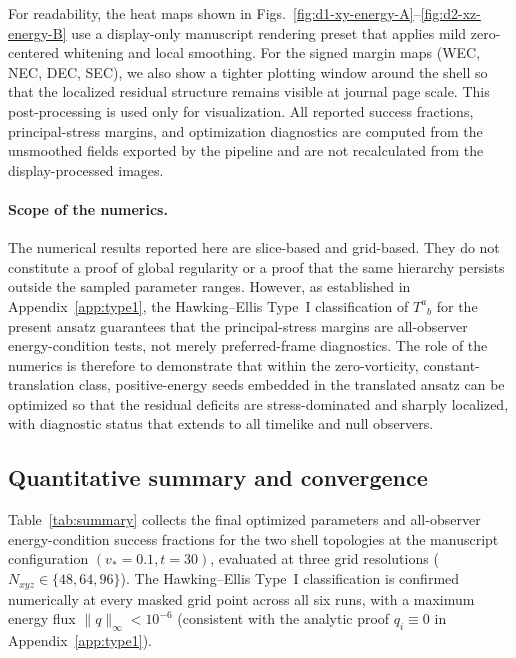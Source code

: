 \documentclass[11pt]{article}
\begin{document}
For readability, the heat maps shown in Figs.~\ref{fig:d1-xy-energy-A}--\ref{fig:d2-xz-energy-B} use a display-only manuscript rendering preset that applies mild zero-centered whitening and local smoothing. For the signed margin maps (WEC, NEC, DEC, SEC), we also show a tighter plotting window around the shell so that the localized residual structure remains visible at journal page scale. This post-processing is used only for visualization. All reported success fractions, principal-stress margins, and optimization diagnostics are computed from the unsmoothed fields exported by the pipeline and are not recalculated from the display-processed images.

\paragraph{Scope of the numerics.}
The numerical results reported here are slice-based and grid-based. They do not constitute a proof of global regularity or a proof that the same hierarchy persists outside the sampled parameter ranges. However, as established in Appendix~\ref{app:type1}, the Hawking--Ellis Type~I classification of $T^a{}_b$ for the present ansatz guarantees that the principal-stress margins are all-observer energy-condition tests, not merely preferred-frame diagnostics. The role of the numerics is therefore to demonstrate that within the zero-vorticity, constant-translation class, positive-energy seeds embedded in the translated ansatz can be optimized so that the residual deficits are stress-dominated and sharply localized, with diagnostic status that extends to all timelike and null observers.

\subsection{Quantitative summary and convergence}
\label{sec:quantitative}

Table~\ref{tab:summary} collects the final optimized parameters and all-observer energy-condition success fractions for the two shell topologies at the manuscript configuration $(v_*=0.1, t=30)$, evaluated at three grid resolutions ($N_{xyz}\in\{48,64,96\}$). The Hawking--Ellis Type~I classification is confirmed numerically at every masked grid point across all six runs, with a maximum energy flux $\|q\|_\infty < 10^{-6}$ (consistent with the analytic proof $q_i\equiv 0$ in Appendix~\ref{app:type1}).
\end{document}
